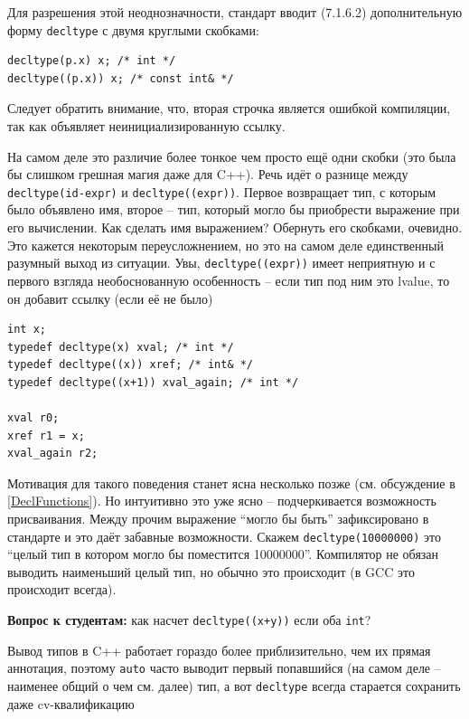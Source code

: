 \documentclass[a4paper,12pt,oneside]{article}
\newif\ifanswers
\begin{document}
Для разрешения этой неоднозначности, стандарт вводит (7.1.6.2) дополнительную форму \lstinline!decltype! с двумя круглыми скобками:

\begin{lstlisting}
decltype(p.x) x; /* int */
decltype((p.x)) x; /* const int& */
\end{lstlisting}

Следует обратить внимание, что, вторая строчка является ошибкой компиляции, так как объявляет неинициализированную ссылку.

На самом деле это различие более тонкое чем просто ещё одни скобки (это была бы слишком грешная магия даже для C++). Речь идёт о разнице между \lstinline!decltype(id-expr)! и \lstinline!decltype((expr))!. Первое возвращает тип, с которым было объявлено имя, второе -- тип, который могло бы приобрести выражение при его вычислении. Как сделать имя выражением? Обернуть его скобками, очевидно. Это кажется некоторым переусложнением, но это на самом деле единственный разумный выход из ситуации. Увы, \lstinline!decltype((expr))! имеет неприятную и с первого взгляда необоснованную особенность -- если тип под ним это lvalue, то он добавит ссылку (если её не было)

\begin{lstlisting}
int x;
typedef decltype(x) xval; /* int */
typedef decltype((x)) xref; /* int& */
typedef decltype((x+1)) xval_again; /* int */

xval r0;
xref r1 = x;
xval_again r2;
\end{lstlisting}

Мотивация для такого поведения станет ясна несколько позже (см. обсуждение в \ref{DeclFunctions}). Но интуитивно это уже ясно -- подчеркивается возможность присваивания. Между прочим выражение ``могло бы быть'' зафиксировано в стандарте и это даёт забавные возможности. Скажем \lstinline!decltype(10000000)! это ``целый тип в котором могло бы поместится 10000000''. Компилятор не обязан выводить наименьший целый тип, но обычно это происходит (в GCC это происходит всегда).

\textbf{Вопрос к студентам:} как насчет \lstinline!decltype((x+y))! если оба \lstinline!int!?

\ifanswers
Правильный ответ: конечно же сумма это не lvalue.
\fi

Вывод типов в C++ работает гораздо более приблизительно, чем их прямая аннотация, поэтому \lstinline!auto! часто выводит первый попавшийся (на самом деле -- наименее общий о чем см. далее) тип, а вот \lstinline!decltype! всегда старается сохранить даже cv-квалификацию
\end{document}
